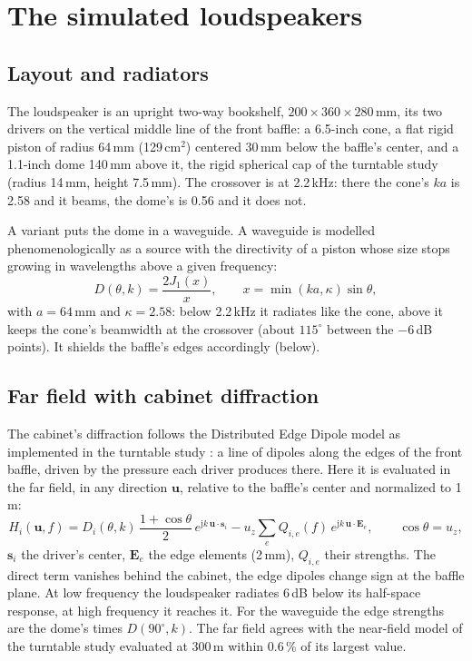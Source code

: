 \documentclass[11pt,a4paper]{article}
\newcommand{\vect}[1]{\mathbf{#1}}
\newcommand{\jj}{\mathrm{j}}
\begin{document}
\section{The simulated loudspeakers}
\label{sec:loudspeaker}

\subsection{Layout and radiators}

The loudspeaker is an upright two-way bookshelf, $200 \times 360 \times 280$\,mm, its two drivers on
the vertical middle line of the front baffle: a 6.5-inch cone, a flat rigid piston of radius 64\,mm
(129\,cm$^2$) centered 30\,mm below the baffle's center, and a 1.1-inch dome 140\,mm above it, the
rigid spherical cap of the turntable study \cite{turntable2026} (radius 14\,mm, height 7.5\,mm). The
crossover is at 2.2\,kHz: there the cone's $ka$ is 2.58 and it beams, the dome's is 0.56 and it does
not.

A variant puts the dome in a waveguide. A waveguide is modelled phenomenologically as a source with
the directivity of a piston whose size stops growing in wavelengths above a given frequency:
\begin{equation}
D(\theta, k) = \frac{2 J_1(x)}{x}, \qquad x = \min(k a, \kappa) \sin\theta,
\end{equation}
with $a = 64$\,mm and $\kappa = 2.58$: below 2.2\,kHz it radiates like the cone, above it keeps the
cone's beamwidth at the crossover (about $115^\circ$ between the $-6$\,dB points). It shields the
baffle's edges accordingly (below).

\subsection{Far field with cabinet diffraction}

The cabinet's diffraction follows the Distributed Edge Dipole model \cite{urban2004} as implemented in
the turntable study \cite{turntable2026}: a line of dipoles along the edges of the front baffle,
driven by the pressure each driver produces there. Here it is evaluated in the far field, in any
direction $\vect u$, relative to the baffle's center and normalized to 1\,m:
\begin{equation}
H_i(\vect u, f) = D_i(\theta, k)\,\frac{1 + \cos\theta}{2}\,e^{\jj k\,\vect u\cdot\vect s_i}
 - u_z \sum_e Q_{i,e}(f)\,e^{\jj k\,\vect u\cdot\vect E_e},
\qquad \cos\theta = u_z,
\end{equation}
$\vect s_i$ the driver's center, $\vect E_e$ the edge elements (2\,mm), $Q_{i,e}$ their strengths. The
direct term vanishes behind the cabinet, the edge dipoles change sign at the baffle plane. At low
frequency the loudspeaker radiates 6\,dB below its half-space response, at high frequency it reaches
it. For the waveguide the edge strengths are the dome's times $D(90^\circ, k)$. The far field agrees with
the near-field model of the turntable study evaluated at 300\,m within 0.6\,\% of its largest value.
\end{document}
